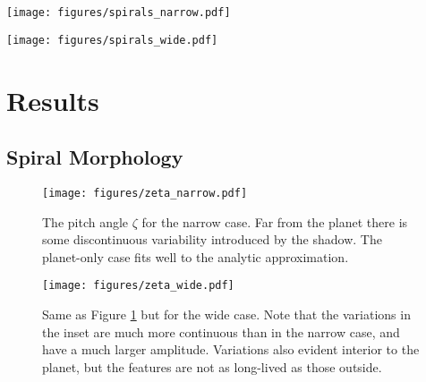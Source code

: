 \documentclass[twocolumn]{aastex631}
\begin{document}
\begin{figure*}
    \texttt{[image: figures/spirals\_narrow.pdf]}
    
    \caption{
        Spiral patterns observed after 99.25 orbits in the narrow shadow case. Shown is the density anomaly for every case.
        The third panel from the left shows the residuals after subtracting the first panel from the second. Plotted on the two
        rightmost panels are the locations identified as being at the peak of the spiral. Note that the color scale on the leftmost
        two panels has been scaled so that all panels can share the same colorbar.
    }
    \label{fig:sp_narrow}
\end{figure*}

\begin{figure*}
    \texttt{[image: figures/spirals\_wide.pdf]}
    \caption{ Same as Figure \ref{fig:sp_narrow} but for the wide shadow case.}
    \label{fig:sp_wide}
\end{figure*}

\section{Results}
\label{sec:results}

\subsection{Spiral Morphology}
\label{subsec:spiral_morph}

\begin{figure}
    \begin{center}
        \texttt{[image: figures/zeta\_narrow.pdf]}
        \caption{
            The pitch angle $\zeta$ for the narrow case. Far from the planet there is some discontinuous variability introduced by the shadow.
            The planet-only case fits well to the analytic approximation.
        }
        \label{fig:zeta_narrow}
    \end{center}
\end{figure}


\begin{figure}
    \begin{center}
        \texttt{[image: figures/zeta\_wide.pdf]}
        \caption{
            Same as Figure \ref{fig:zeta_narrow} but for the wide case. Note that the variations in the inset are much more continuous than in the
            narrow case, and have a much larger amplitude. Variations also evident interior to the planet, but the features are not as long-lived
            as those outside.
        }
        \label{fig:zeta_wide}
    \end{center}
\end{figure}
\end{document}
